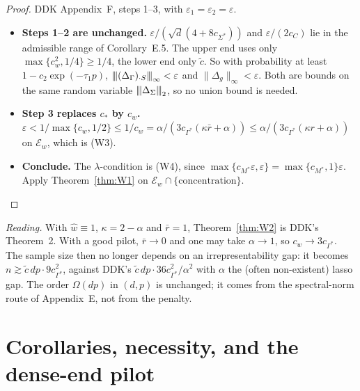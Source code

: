 \documentclass[11pt,a4paper]{article}
\numberwithin{equation}{section}
\theoremstyle{plain}
\theoremstyle{remark}
\newcommand{\opnorm}[1]{{\vert\kern-0.25ex\vert\kern-0.25ex\vert #1 \vert\kern-0.25ex\vert\kern-0.25ex\vert}}
\begin{document}
\begin{proof}
DDK Appendix~F, steps 1--3, with $\varepsilon_1=\varepsilon_2=\varepsilon$.
\begin{itemize}
  \item \textbf{Steps 1--2 are unchanged.} $\varepsilon/(\sqrt d(4+8c_{\Sigma^*}))$ and $\varepsilon/(2c_C)$ lie in the admissible range of Corollary~E.5. The upper end uses only $\max\{c_w^2,1/4\}\ge1/4$, the lower end only $\tilde c$. So with probability at least $1-c_2\exp(-\tau_1p)$, $\opnorm{(\Delta_\Gamma)_{\cdot S}}_\infty<\varepsilon$ and $\|\Delta_g\|_\infty<\varepsilon$. Both are bounds on the same random variable $\opnorm{\Delta_\Sigma}_2$, so no union bound is needed.
  \item \textbf{Step 3 replaces $c_*$ by $c_w$.} $\varepsilon<1/\max\{c_w,1/2\}\le1/c_w=\alpha/(3c_{\Gamma^*}(\kappa\bar r+\alpha))\le\alpha/(3c_{\Gamma^*}(\kappa r+\alpha))$ on $\mathcal E_w$, which is (W3).
  \item \textbf{Conclude.} The $\lambda$-condition is (W4), since $\max\{c_{M^*}\varepsilon,\varepsilon\}=\max\{c_{M^*},1\}\varepsilon$. Apply Theorem~\ref{thm:W1} on $\mathcal E_w\cap\{\text{concentration}\}$.\qedhere
\end{itemize}
\end{proof}

\emph{Reading.} With $\hat w\equiv1$, $\kappa=2-\alpha$ and $\bar r=1$, Theorem~\ref{thm:W2} is DDK's Theorem~2. With a good pilot, $\bar r\to0$ and one may take $\alpha\to1$, so $c_w\to3c_{\Gamma^*}$. The sample size then no longer depends on an irrepresentability gap: it becomes $n\gtrsim\tilde c\,dp\cdot9c_{\Gamma^*}^2$, against DDK's $\tilde c\,dp\cdot36c_{\Gamma^*}^2/\alpha^2$ with $\alpha$ the (often non-existent) lasso gap. The order $\Omega(dp)$ in $(d,p)$ is unchanged; it comes from the spectral-norm route of Appendix~E, not from the penalty.

\section{Corollaries, necessity, and the dense-end pilot}\label{sec:corollaries}
\end{document}
